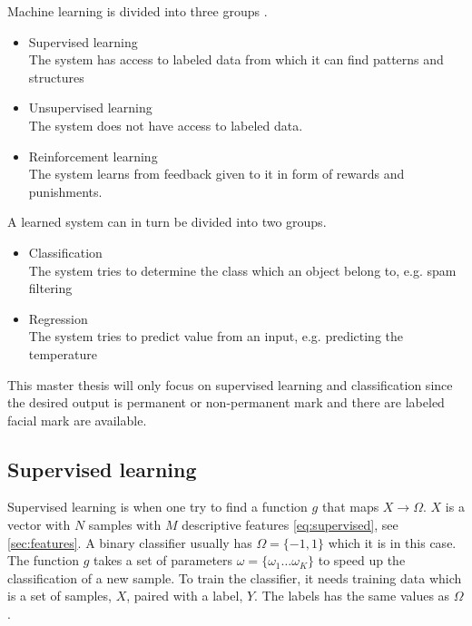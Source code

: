 Machine learning is divided into three groups \cite{bishop2006pattern}. 

\begin{itemize}
	\item Supervised learning \\
	The system has access to labeled data from which it can find patterns and structures
	  
	\item Unsupervised learning \\
	The system does not have access to labeled data.
	
	\item Reinforcement learning \\
	The system learns from feedback given to it in form of rewards and punishments. 
\end{itemize}

A learned system can in turn be divided into two groups. 

\begin{itemize}
		\item Classification \\
		The system tries to determine the class which an object belong to, e.g. spam filtering
		
		\item Regression \\
		The system tries to predict value from an input, e.g. predicting the temperature 
\end{itemize}

This master thesis will only focus on supervised learning and classification since the desired output is permanent or non-permanent mark and there are labeled facial mark are available.  

\subsection{Supervised learning}

Supervised learning is when one try to find a function $g$ that maps $X \to \Omega$. $X$ is a vector with $N$ samples with $M$ descriptive features \cref{eq:supervised}, see \cref{sec:features}. A binary classifier usually has $\Omega = \{-1,1\}$ which it is in this case. The function $g$ takes a set of parameters $\omega = \{\omega_1 \dots \omega_K\} $ to speed up the classification of a new sample. To train the classifier, it needs training data which is a set of samples, $X$, paired with a label, $Y$. The labels has the same values as $\Omega$. 

